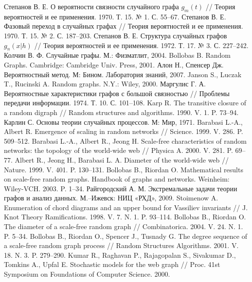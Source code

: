 \documentclass[14pt]{extreport}
\begin{document}

%
\begin{thebibliography}{9}

\bibitem{}
Степанов В. Е. О вероятности связности случайного графа $g_m(t)$ // Теория вероятностей и ее применения. 1970. Т. 15. № 1. С. 55–67.
\bibitem{}
Степанов В. Е. Фазовый переход в случайных графах // Теория вероятностей и ее применения. 1970. Т. 15. № 2. С. 187–203.
\bibitem{}
Степанов В. Е. Структура случайных графов $g_n(x|h)$ // Теория вероятностей и ее применения. 1972. Т. 17. № 3. С. 227–242.
\bibitem{}
Колчин В. Ф. Случайные графы. М.: Физматлит, 2004.
\bibitem{}
Bollobas B. Random Graphs. Cambridge: Cambridge Univ. Press, 2001.
\bibitem{}
Алон Н., Спенсер Дж. Вероятностный метод. М: Бином. Лаборатория знаний, 2007.
\bibitem{}
Janson S., Luczak T., Rucinski A. Random graphs. N.Y.: Wiley, 2000.
\bibitem{}
Маргулис Г. А. Вероятностные характеристики графов с большой связностью // Проблемы передачи информации. 1974. Т. 10. С. 101–108.
\bibitem{}
Karp R. The transitive closure of a random digraph // Random structures and algorithms. 1990. V. 1. P. 73–94.
\bibitem{}
Карлин С. Основы теории случайных процессов. М: Мир, 1971.
\bibitem{}
Barabasi L.-A., Albert R. Emergence of scaling in random networks // Science. 1999. V. 286. P. 509–512.
\bibitem{}
Barabasi L.-A., Albert R., Jeong H. Scale-free characteristics of random networks: the topology of the world-wide web // Physica A. 2000. V. 281. P. 69–77.
\bibitem{}
Albert R., Jeong H., Barabasi L. A. Diameter of the world-wide web // Nature. 1999. V. 401. P. 130–131.
\bibitem{}
Bollobas B., Riordan O. Mathematical results on scale-free random graphs. Handbook of graphs and networks. Weinheim: Wiley-VCH. 2003. P. 1–34.
\bibitem{}
Райгородский А. М. Экстремальные задачи теории графов и анализ данных. М.–Ижевск: НИЦ «РХД», 2009.
\bibitem{}
Stoimenow A. Enumeration of chord diagrams and an upper bound for Vassiliev invariants // J. Knot Theory Ramifications. 1998. V. 7. N. 1. P. 93–114.
\bibitem{}
Bollobas B., Riordan O. The diameter of a scale-free random graph // Combinatorica. 2004. V. 24. N. 1. P. 5–34.
\bibitem{}
Bollobas B., Riordan O., Spencer J., Tusnady G. The degree sequence of a scale-free random graph process // Random Structures Algorithms. 2001. V. 18. N. 3. P. 279–290.
\bibitem{}
Kumar R., Raghavan P., Rajagopalan S., Sivakumar D., Tomkins A., Upfal E. Stochastic models for the web graph // Proc. 41st Symposium on Foundations of Computer Science. 2000.

\end{thebibliography}
\newpage
\end{document}
